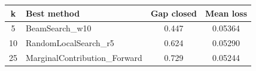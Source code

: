 \begin{tabular}{clcc}
\toprule
k & Best method & Gap closed & Mean loss \\

\midrule
5 & BeamSearch\_w10 & 0.447 & 0.05364 \\
10 & RandomLocalSearch\_r5 & 0.624 & 0.05290 \\
25 & MarginalContribution\_Forward & 0.729 & 0.05244 \\
\bottomrule
\end{tabular}

